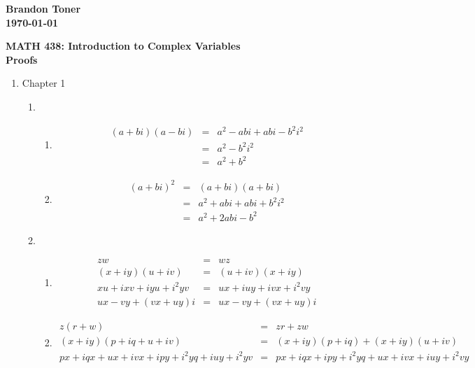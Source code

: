 \documentclass{article}%
\begin{document}
\begin{flushright}
\textbf{Brandon Toner \\
\today}
\end{flushright}

\begin{center}
\textbf{MATH 438: Introduction to Complex Variables \\
Proofs} \\
\end{center}

\begin{enumerate}
  \item Chapter 1
  \begin{enumerate}[label*=\arabic*.]
    \item 
    \begin{enumerate}[label=\alph*]
      \item \begin{eqnarray*}
            (a+b i)(a-b i) &=& a^2 - a b i + a b i - b^2 i^2  \\
                           &=& a^2 - b^2 i^2 \\
                           &=& a^2 + b^2
            \end{eqnarray*}
      \item \begin{eqnarray*}
            (a+b i)^2 &=& (a+b i)(a+bi) \\
                      &=& a^2 + abi + abi + b^2 i^2 \\
                      &=& a^2  + 2abi - b^2
            \end{eqnarray*}
    \end{enumerate}
    \item
	\begin{enumerate}[label=\alph*]
        \item \begin{eqnarray*}
            zw&=&wz \\
            (x+iy)(u+iv)&=&(u+iv)(x+iy) \\
            xu+ixv+iyu+i^2yv&=&ux+iuy+ivx+i^2vy \\
            ux-vy+(vx+uy)i&=&ux-vy+(vx+uy)i
        \end{eqnarray*}
        \item \begin{eqnarray*}
            z(r+w)&=&zr+zw \\
            (x+iy)(p+iq+u+iv)&=&(x+iy)(p+iq)+(x+iy)(u+iv) \\
            px+iqx+ux+ivx+ipy+i^2yq+iuy+i^2yv&=&px+iqx+ipy+i^2yq+ux+ivx+iuy+i^2vy \\

\end{eqnarray*}
\end{enumerate}
\end{enumerate}
\end{enumerate}
\end{document}
